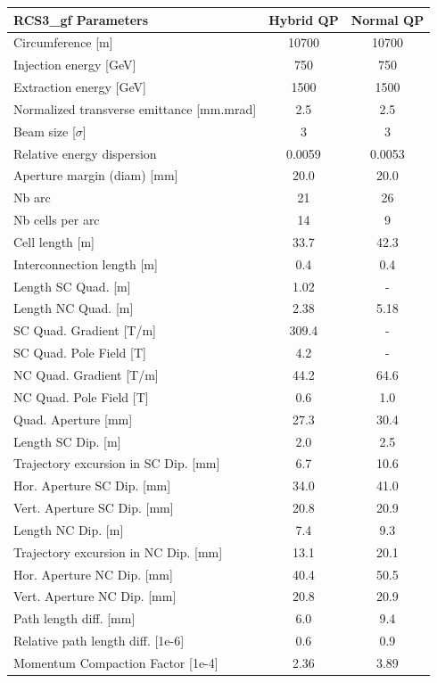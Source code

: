 \begin{tabular}{lcc}
\toprule
RCS3_gf Parameters & Hybrid QP & Normal QP \\
\midrule
Circumference [m] & 10700 & 10700 \\
Injection energy [GeV] & 750 & 750 \\
Extraction energy [GeV] & 1500 & 1500 \\
Normalized transverse emittance [mm.mrad] & 2.5 & 2.5 \\
Beam size [$\sigma$] & 3 & 3 \\
Relative energy dispersion & 0.0059 & 0.0053 \\
Aperture margin (diam) [mm] & 20.0 & 20.0 \\
Nb arc & 21 & 26 \\
Nb cells per arc & 14 & 9 \\
Cell length [m] & 33.7 & 42.3 \\
Interconnection length [m] & 0.4 & 0.4 \\
Length SC Quad. [m] & 1.02 & - \\
Length NC Quad. [m] & 2.38 & 5.18 \\
SC Quad. Gradient [T/m] & 309.4 & - \\
SC Quad. Pole Field [T] & 4.2 & - \\
NC Quad. Gradient [T/m] & 44.2 & 64.6 \\
NC Quad. Pole Field [T] & 0.6 & 1.0 \\
Quad. Aperture [mm] & 27.3 & 30.4 \\
Length SC Dip. [m] & 2.0 & 2.5 \\
Trajectory excursion in SC Dip. [mm] & 6.7 & 10.6 \\
Hor. Aperture SC Dip. [mm] & 34.0 & 41.0 \\
Vert. Aperture SC Dip. [mm] & 20.8 & 20.9 \\
Length NC Dip. [m] & 7.4 & 9.3 \\
Trajectory excursion in NC Dip. [mm] & 13.1 & 20.1 \\
Hor. Aperture NC Dip. [mm] & 40.4 & 50.5 \\
Vert. Aperture NC Dip. [mm] & 20.8 & 20.9 \\
Path length diff. [mm] & 6.0 & 9.4 \\
Relative path length diff. [1e-6] & 0.6 & 0.9 \\
Momentum Compaction Factor [1e-4] & 2.36 & 3.89 \\
\bottomrule
\end{tabular}
